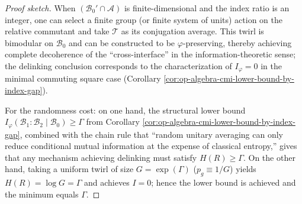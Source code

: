 \begin{proof}[Proof sketch]
When \((\mathcal{B}_0'\cap\mathcal{A})\) is finite-dimensional and the index ratio is an integer, one can select a finite group (or finite system of units) action on the relative commutant and take \(\mathcal{T}\) as its conjugation average.
This twirl is bimodular on \(\mathcal{B}_0\) and can be constructed to be \(\varphi\)-preserving, thereby achieving complete decoherence of the ``cross-interface'' in the information-theoretic sense; the delinking conclusion corresponds to the characterization of \(I_\varphi=0\) in the minimal commuting square case (Corollary \ref{cor:op-algebra-cmi-lower-bound-by-index-gap}).
\par
For the randomness cost: on one hand, the structural lower bound \(I_\varphi(\mathcal{B}_1:\mathcal{B}_2\mid\mathcal{B}_0)\ge\Gamma\) from Corollary \ref{cor:op-algebra-cmi-lower-bound-by-index-gap}, combined with the chain rule that ``random unitary averaging can only reduce conditional mutual information at the expense of classical entropy,'' gives that any mechanism achieving delinking must satisfy \(H(R)\ge\Gamma\).
On the other hand, taking a uniform twirl of size \(G=\exp(\Gamma)\) (\(p_g\equiv 1/G\)) yields \(H(R)=\log G=\Gamma\) and achieves \(I=0\);
hence the lower bound is achieved and the minimum equals \(\Gamma\). \qedhere
\end{proof}

